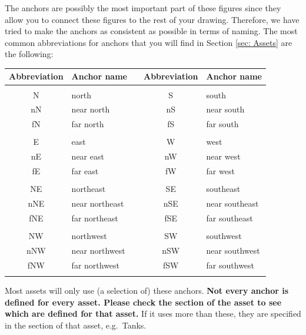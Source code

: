 The anchors are possibly the most important part of these figures since they allow you to connect these figures to the rest of your drawing. 
Therefore, we have tried to make the anchors as consistent as possible in terms of naming. 
The most common abbreviations for anchors that you will find in Section \ref{sec: Assets} are the following:

\begin{center}
    \begin{tabular}{c|lcc|l}
        Abbreviation & Anchor name & & Abbreviation & Anchor name \\
        \hline & & & & \\
        N & north & & S & south\\
        nN & near north & & nS & near south \\
        fN & far north & & fS & far south \\
        & & & & \\
        E & east & & W & west \\
        nE & near east & & nW & near west \\
        fE & far east  & & fW & far west \\
        & & & & \\
        NE & northeast & &  SE & southeast \\
        nNE & near northeast & &  nSE & near southeast \\
        fNE & far northeast & &  fSE & far southeast \\
        & & & & \\
        NW & northwest & & SW & southwest \\
        nNW & near northwest & &  nSW & near southwest \\
        fNW & far northwest & &  fSW & far southwest \\
        & & & & \\
    \end{tabular}
\end{center}

Most assets will only use (a selection of) these anchors. \textbf{Not every anchor is defined for every asset. Please check the section of the asset to see which are defined for that asset.}  
If it uses more than these, they are specified in the section of that asset, e.g.~Tanks. 
